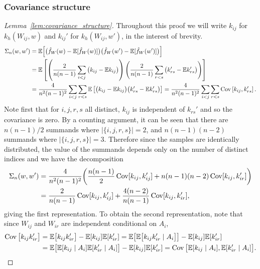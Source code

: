 \subsubsection{Covariance structure}

\begin{proof}[Lemma~\ref{lem:covariance_structure}]

  Throughout this proof we will write
  $k_{ij}$ for $k_h(W_{ij},w)$
  and
  $k_{ij}'$ for $k_h(W_{ij},w')$,
  in the interest of brevity.
  \begin{align*}
    \Sigma_n(w,w')
    &=
    \mathbb{E}\Big[
      \big(
      \hat f_W(w)
      - \mathbb{E}[\hat f_W(w)]
      \big)
      \big(
      \hat f_W(w')
      - \mathbb{E}[\hat f_W(w')]
      \big)
      \Big] \\
    &=
    \mathbb{E}\left[
      \left(
        \frac{2}{n(n-1)}
        \sum_{i<j}
        \big(
        k_{ij} - \mathbb{E} k_{ij}
        \big)
      \right)
      \left(
        \frac{2}{n(n-1)}
        \sum_{r<s}
        \big(
        k_{rs}' - \mathbb{E} k_{rs}'
        \big)
      \right)
    \right] \\
    &=
    \frac{4}{n^2(n-1)^2}
    \sum_{i<j}
    \sum_{r<s}
    \mathbb{E}\left[
      \big(
      k_{ij} - \mathbb{E} k_{ij}
      \big)
      \big(
      k_{rs}' - \mathbb{E} k_{rs}'
      \big)
    \right]
    =
    \frac{4}{n^2(n-1)^2}
    \sum_{i<j}
    \sum_{r<s}
    \operatorname{Cov}\left[
      k_{ij},
      k_{rs}'
    \right].
  \end{align*}
  Note first that
  for $i,j,r,s$ all distinct,
  $k_{ij}$ is independent of $k_{rs}'$
  and so the covariance is zero.
  By a counting argument,
  it can be seen that
  there are
  $n(n-1)/2$
  summands where
  $|\{i,j,r,s\}| = 2$,
  and
  $n(n-1)(n-2)$
  summands where
  $|\{i,j,r,s\}| = 3$.
  Therefore since the samples
  are identically distributed,
  the value of the summands
  depends only on the number of distinct indices
  and we have the decomposition
  \begin{align*}
    \Sigma_n(w,w')
    &=
    \frac{4}{n^2(n-1)^2}
    \bigg(
    \frac{n(n-1)}{2}
    \operatorname{Cov}[k_{ij}, k_{ij}']
    + n(n-1)(n-2)
    \operatorname{Cov}[k_{ij}, k_{ir}']
    \bigg) \\
    &=
    \frac{2}{n(n-1)}
    \operatorname{Cov}[k_{ij}, k_{ij}']
    + \frac{4(n-2)}{n(n-1)}
    \operatorname{Cov}[k_{ij}, k_{ir}'],
  \end{align*}
  giving the first representation.
  To obtain the second representation,
  note that since
  $W_{ij}$ and $W_{ir}$
  are independent conditional
  on $A_i$,
  \begin{align*}
    \operatorname{Cov}\big[
      k_{ij}
      k_{ir}'
      \big]
    &=
    \mathbb{E}\big[
      k_{ij}
      k_{ir}'
      \big]
    -
    \mathbb{E}[k_{ij}]
    \mathbb{E}[k_{ir}']
    =
    \mathbb{E}\big[
      \mathbb{E}\big[
        k_{ij}
        k_{ir}'
        \mid A_i
        \big]
      \big]
    -
    \mathbb{E}[k_{ij}]
    \mathbb{E}[k_{ir}'] \\
    &=
    \mathbb{E}\big[
      \mathbb{E}[k_{ij} \mid A_i]
      \mathbb{E}[k_{ir}' \mid A_i]
      \big]
    -
    \mathbb{E}[k_{ij}]
    \mathbb{E}[k_{ir}']
    =
    \operatorname{Cov}\big[
      \mathbb{E}[k_{ij} \mid A_i],
      \mathbb{E}[k_{ir}' \mid A_i]
      \big].
  \end{align*}
\end{proof}

